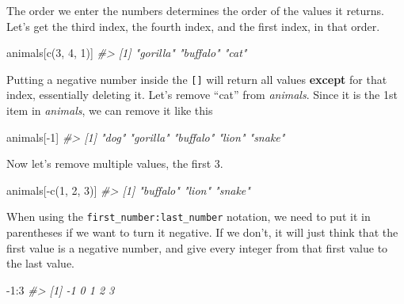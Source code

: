 \documentclass[
]{krantz}
\makeatletter
\newenvironment{Shaded}{\begin{snugshade}}{\end{snugshade}}
\newcommand{\CommentTok}[1]{\textcolor[rgb]{0.37,0.37,0.37}{\textit{#1}}}
\newcommand{\DecValTok}[1]{\textcolor[rgb]{0.06,0.06,0.06}{#1}}
\newcommand{\FunctionTok}[1]{\textcolor[rgb]{0,0,0}{#1}}
\newcommand{\NormalTok}[1]{#1}
\newcommand{\SpecialCharTok}[1]{\textcolor[rgb]{0,0,0}{#1}}
\newenvironment{kframe}{%
\medskip{}
\setlength{\fboxsep}{.8em}
 \def\at@end@of@kframe{}%
 \ifinner\ifhmode%
  \def\at@end@of@kframe{\end{minipage}}%
  \begin{minipage}{\columnwidth}%
 \fi\fi%
 \def\FrameCommand##1{\hskip\@totalleftmargin \hskip-\fboxsep
 \colorbox{shadecolor}{##1}\hskip-\fboxsep
     \hskip-\linewidth \hskip-\@totalleftmargin \hskip\columnwidth}%
 \MakeFramed {\advance\hsize-\width
   \@totalleftmargin\z@ \linewidth\hsize
   \@setminipage}}%
 {\par\unskip\endMakeFramed%
 \at@end@of@kframe}
\renewenvironment{Shaded}{\begin{kframe}}{\end{kframe}}
\makeatother
\begin{document}
The order we enter the numbers determines the order of the
values it returns. Let's get the third index, the fourth
index, and the first index, in that order.

\begin{Shaded}
\begin{Highlighting}[]
\NormalTok{animals[}\FunctionTok{c}\NormalTok{(}\DecValTok{3}\NormalTok{, }\DecValTok{4}\NormalTok{, }\DecValTok{1}\NormalTok{)]}
\CommentTok{\#\textgreater{} [1] "gorilla" "buffalo" "cat"}
\end{Highlighting}
\end{Shaded}

Putting a negative number inside the \texttt{{[}{]}} will
return all values \textbf{except} for that index,
essentially deleting it. Let's remove ``cat'' from
\emph{animals}. Since it is the 1st item in \emph{animals},
we can remove it like this

\begin{Shaded}
\begin{Highlighting}[]
\NormalTok{animals[}\SpecialCharTok{{-}}\DecValTok{1}\NormalTok{]}
\CommentTok{\#\textgreater{} [1] "dog"     "gorilla" "buffalo" "lion"    "snake"}
\end{Highlighting}
\end{Shaded}

Now let's remove multiple values, the first 3.

\begin{Shaded}
\begin{Highlighting}[]
\NormalTok{animals[}\SpecialCharTok{{-}}\FunctionTok{c}\NormalTok{(}\DecValTok{1}\NormalTok{, }\DecValTok{2}\NormalTok{, }\DecValTok{3}\NormalTok{)]}
\CommentTok{\#\textgreater{} [1] "buffalo" "lion"    "snake"}
\end{Highlighting}
\end{Shaded}

When using the \texttt{first\_number:last\_number} notation,
we need to put it in parentheses if we want to turn it
negative. If we don't, it will just think that the first
value is a negative number, and give every integer from that
first value to the last value.

\begin{Shaded}
\begin{Highlighting}[]
\SpecialCharTok{{-}}\DecValTok{1}\SpecialCharTok{:}\DecValTok{3}
\CommentTok{\#\textgreater{} [1] {-}1  0  1  2  3}
\end{Highlighting}
\end{Shaded}
\end{document}
